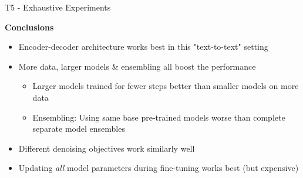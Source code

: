 \begin{frame}{T5 - Exhaustive Experiments}

\vfill
	
	\textbf{Conclusions}
	
	\begin{itemize}
		\item Encoder-decoder architecture works best in this "text-to-text" setting
		\item More data, larger models \& ensembling all boost the performance
			\begin{itemize}
				\item Larger models trained for fewer steps better than smaller models on more data
				\item Ensembling: Using same base pre-trained models worse than complete separate model ensembles
			\end{itemize}
		\item Different denoising objectives work similarly well
		\item Updating \textit{all} model parameters during fine-tuning works best (but expensive)
	\end{itemize}
	
\vfill

\end{frame}


\endlecture

